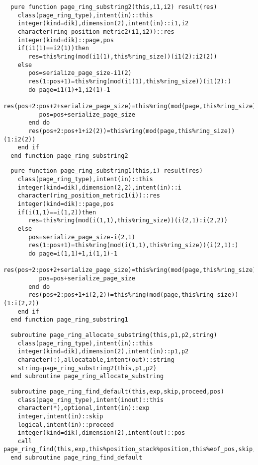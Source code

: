 \begin{Verbatim}
  pure function page_ring_substring2(this,i1,i2) result(res)
    class(page_ring_type),intent(in)::this
    integer(kind=dik),dimension(2),intent(in)::i1,i2
    character(ring_position_metric2(i1,i2))::res
    integer(kind=dik)::page,pos
    if(i1(1)==i2(1))then
       res=this%ring(mod(i1(1),this%ring_size))(i1(2):i2(2))
    else
       pos=serialize_page_size-i1(2)
       res(1:pos+1)=this%ring(mod(i1(1),this%ring_size))(i1(2):)
       do page=i1(1)+1,i2(1)-1
          res(pos+2:pos+2+serialize_page_size)=this%ring(mod(page,this%ring_size))
          pos=pos+serialize_page_size
       end do
       res(pos+2:pos+1+i2(2))=this%ring(mod(page,this%ring_size))(1:i2(2))
    end if
  end function page_ring_substring2
\end{Verbatim}

\begin{Verbatim}
  pure function page_ring_substring1(this,i) result(res)
    class(page_ring_type),intent(in)::this
    integer(kind=dik),dimension(2,2),intent(in)::i
    character(ring_position_metric1(i))::res
    integer(kind=dik)::page,pos
    if(i(1,1)==i(1,2))then
       res=this%ring(mod(i(1,1),this%ring_size))(i(2,1):i(2,2))
    else
       pos=serialize_page_size-i(2,1)
       res(1:pos+1)=this%ring(mod(i(1,1),this%ring_size))(i(2,1):)
       do page=i(1,1)+1,i(1,1)-1
          res(pos+2:pos+2+serialize_page_size)=this%ring(mod(page,this%ring_size))
          pos=pos+serialize_page_size
       end do
       res(pos+2:pos+1+i(2,2))=this%ring(mod(page,this%ring_size))(1:i(2,2))
    end if
  end function page_ring_substring1
\end{Verbatim}

\begin{Verbatim}
  subroutine page_ring_allocate_substring(this,p1,p2,string)
    class(page_ring_type),intent(in)::this
    integer(kind=dik),dimension(2),intent(in)::p1,p2
    character(:),allocatable,intent(out)::string
    string=page_ring_substring2(this,p1,p2)
  end subroutine page_ring_allocate_substring
\end{Verbatim}

\begin{Verbatim}
  subroutine page_ring_find_default(this,exp,skip,proceed,pos)
    class(page_ring_type),intent(inout)::this
    character(*),optional,intent(in)::exp
    integer,intent(in)::skip
    logical,intent(in)::proceed
    integer(kind=dik),dimension(2),intent(out)::pos
    call page_ring_find(this,exp,this%position_stack%position,this%eof_pos,skip,proceed,pos)
  end subroutine page_ring_find_default
\end{Verbatim}

